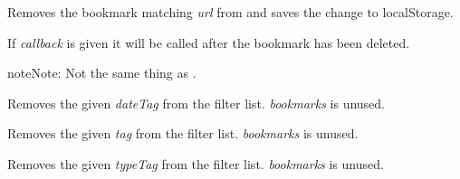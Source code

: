 \documentclass[letterpaper,10pt,openany]{sphinxmanual}
\begin{document}
\begin{fulllineitems}
\label{Applications/terminal/plugin_bookmarks:GateOne.Bookmarks.removeBookmark}
Removes the bookmark matching \emph{url} from  and saves the change to localStorage.

If \emph{callback} is given it will be called after the bookmark has been deleted.

\begin{notice}{note}{Note:}
Not the same thing as {\hyperref[Applications/terminal/plugin_bookmarks:GateOne.Bookmarks.deleteBookmark]{}}.
\end{notice}

\end{fulllineitems}


\begin{fulllineitems}
\label{Applications/terminal/plugin_bookmarks:GateOne.Bookmarks.removeFilterDateTag}
Removes the given \emph{dateTag} from the filter list.  \emph{bookmarks} is unused.

\end{fulllineitems}


\begin{fulllineitems}
\label{Applications/terminal/plugin_bookmarks:GateOne.Bookmarks.removeFilterTag}
Removes the given \emph{tag} from the filter list.  \emph{bookmarks} is unused.

\end{fulllineitems}


\begin{fulllineitems}
\label{Applications/terminal/plugin_bookmarks:GateOne.Bookmarks.removeFilterURLTypeTag}
Removes the given \emph{typeTag} from the filter list.  \emph{bookmarks} is unused.

\end{fulllineitems}
\end{document}
